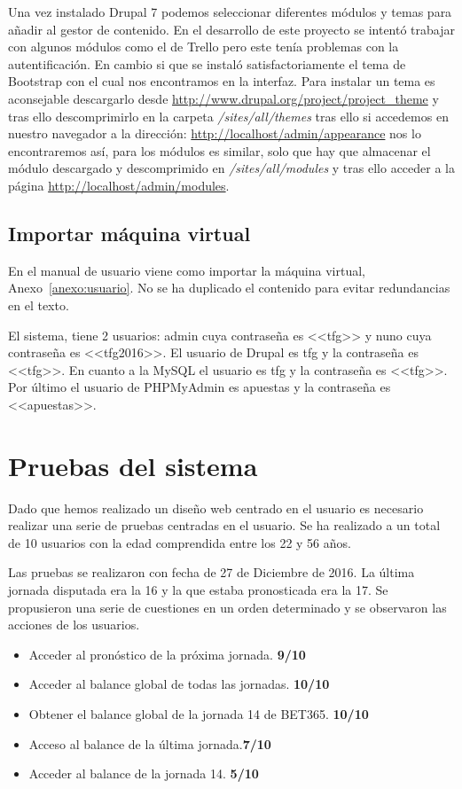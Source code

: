 Una vez instalado Drupal 7 podemos seleccionar diferentes módulos y temas para añadir al gestor de contenido. En el desarrollo de este proyecto se intentó trabajar con algunos módulos como el de Trello pero este tenía problemas con la autentificación. En cambio si que se instaló satisfactoriamente el tema de Bootstrap con el cual nos encontramos en la interfaz. Para instalar un tema es aconsejable descargarlo desde \url{http://www.drupal.org/project/project_theme} y tras ello descomprimirlo en la carpeta \textit{/sites/all/themes} tras ello si accedemos en nuestro navegador a la dirección: \url{http://localhost/admin/appearance} nos lo encontraremos así, para los módulos es similar, solo que hay que almacenar el módulo descargado y descomprimido en \textit{/sites/all/modules} y tras ello acceder a la página \url{http://localhost/admin/modules}.

\subsection{Importar máquina virtual}

En el manual de usuario viene como importar la máquina virtual, Anexo~\ref{anexo:usuario}. No se ha duplicado el contenido para evitar redundancias en el texto.

El sistema, tiene 2 usuarios: admin cuya contraseña es <<tfg>> y nuno cuya contraseña es <<tfg2016>>. El usuario de Drupal es tfg y la contraseña es <<tfg>>.
En cuanto a la MySQL el usuario es tfg y la contraseña es <<tfg>>. 
Por último el usuario de PHPMyAdmin es apuestas y la contraseña es <<apuestas>>.
\section{Pruebas del sistema}

Dado que hemos realizado un diseño web centrado en el usuario es necesario realizar una serie de pruebas centradas en el usuario. Se ha realizado a un total de 10 usuarios con la edad comprendida entre los 22 y 56 años.

Las pruebas se realizaron con fecha de 27 de Diciembre de 2016. La última jornada disputada era la 16 y la que estaba pronosticada era la 17. Se propusieron una serie de cuestiones en un orden determinado y se observaron las acciones de los usuarios.

\begin{itemize}
\item Acceder al pronóstico de la próxima jornada. \textbf{9/10}
\item Acceder al balance global de todas las jornadas. \textbf{10/10}
\item Obtener el balance global de la jornada 14 de BET365. \textbf{10/10}
\item Acceso al balance de la última jornada.\textbf{7/10}
\item Acceder al balance de la jornada 14. \textbf{5/10}
\end{itemize}

